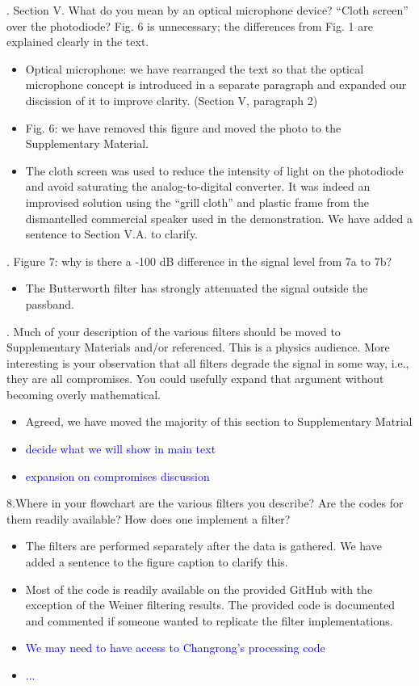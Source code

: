 \documentclass{article}
\newcommand{\todo}{\textcolor{blue}}
\begin{document}
. Section V.  What do you mean by an optical microphone device?  “Cloth screen” over the photodiode?  Fig. 6 is unnecessary; the differences from Fig. 1 are explained clearly in the text.
\begin{itemize}
\item Optical microphone: we have rearranged the text so that the optical microphone concept is introduced in a separate paragraph and expanded our discission of it to improve clarity. (Section V, paragraph 2)
\item Fig. 6: we have removed this figure and moved the photo to the Supplementary Material.
\item The cloth screen was used to reduce the intensity of light on the photodiode and avoid saturating the analog-to-digital converter. It was indeed an improvised solution using the ``grill cloth'' and plastic frame from the dismantelled commercial speaker used in the demonstration. We have added a sentence to Section V.A. to clarify.
\end{itemize}  



. Figure 7: why is there a -100 dB difference in the signal level from 7a to 7b?  
\begin{itemize}
\item The Butterworth filter has strongly attenuated the signal outside the passband.
\end{itemize}


. Much of your description of the various filters should be moved to Supplementary Materials and/or referenced.  This is a physics audience.  More interesting is your observation that all filters degrade the signal in some way, i.e., they are all compromises.  You could usefully expand that argument without becoming overly mathematical.
\begin{itemize}
\item Agreed, we have moved the majority of this section to Supplementary Matrial
\item \todo{decide what we will show in main text}
\item \todo{expansion on compromises discussion}
\end{itemize}


\noindent 8.Where in your flowchart are the various filters you describe?  Are the codes for them readily available?  How does one implement a filter?  
\begin{itemize}
\item The filters are performed separately after the data is gathered. We have added a sentence to the figure caption to clarify this. 
\item Most of the code is readily available on the provided GitHub with the exception of the Weiner filtering results. The provided code is documented and commented if someone wanted to replicate the filter implementations.
\item \todo{We may need to have access to Changrong's processing code}
\item \todo{...}
\end{itemize}
\end{document}
